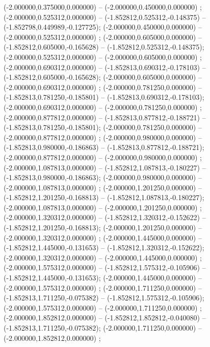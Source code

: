  (-2.000000,0.375000,0.000000) -- (-2.000000,0.450000,0.000000) ;
 (-2.000000,0.525312,0.000000) -- (-1.852812,0.525312,-0.148375) -- (-1.852798,0.449989,-0.127725);
 (-2.000000,0.450000,0.000000) -- (-2.000000,0.525312,0.000000) ;
 (-2.000000,0.605000,0.000000) -- (-1.852812,0.605000,-0.165628) -- (-1.852812,0.525312,-0.148375);
 (-2.000000,0.525312,0.000000) -- (-2.000000,0.605000,0.000000) ;
 (-2.000000,0.690312,0.000000) -- (-1.852813,0.690312,-0.178103) -- (-1.852812,0.605000,-0.165628);
 (-2.000000,0.605000,0.000000) -- (-2.000000,0.690312,0.000000) ;
 (-2.000000,0.781250,0.000000) -- (-1.852813,0.781250,-0.185801) -- (-1.852813,0.690312,-0.178103);
 (-2.000000,0.690312,0.000000) -- (-2.000000,0.781250,0.000000) ;
 (-2.000000,0.877812,0.000000) -- (-1.852813,0.877812,-0.188721) -- (-1.852813,0.781250,-0.185801);
 (-2.000000,0.781250,0.000000) -- (-2.000000,0.877812,0.000000) ;
 (-2.000000,0.980000,0.000000) -- (-1.852813,0.980000,-0.186863) -- (-1.852813,0.877812,-0.188721);
 (-2.000000,0.877812,0.000000) -- (-2.000000,0.980000,0.000000) ;
 (-2.000000,1.087813,0.000000) -- (-1.852812,1.087813,-0.180227) -- (-1.852813,0.980000,-0.186863);
 (-2.000000,0.980000,0.000000) -- (-2.000000,1.087813,0.000000) ;
 (-2.000000,1.201250,0.000000) -- (-1.852812,1.201250,-0.168813) -- (-1.852812,1.087813,-0.180227);
 (-2.000000,1.087813,0.000000) -- (-2.000000,1.201250,0.000000) ;
 (-2.000000,1.320312,0.000000) -- (-1.852812,1.320312,-0.152622) -- (-1.852812,1.201250,-0.168813);
 (-2.000000,1.201250,0.000000) -- (-2.000000,1.320312,0.000000) ;
 (-2.000000,1.445000,0.000000) -- (-1.852812,1.445000,-0.131653) -- (-1.852812,1.320312,-0.152622);
 (-2.000000,1.320312,0.000000) -- (-2.000000,1.445000,0.000000) ;
 (-2.000000,1.575312,0.000000) -- (-1.852812,1.575312,-0.105906) -- (-1.852812,1.445000,-0.131653);
 (-2.000000,1.445000,0.000000) -- (-2.000000,1.575312,0.000000) ;
 (-2.000000,1.711250,0.000000) -- (-1.852813,1.711250,-0.075382) -- (-1.852812,1.575312,-0.105906);
 (-2.000000,1.575312,0.000000) -- (-2.000000,1.711250,0.000000) ;
 (-2.000000,1.852812,0.000000) -- (-1.852812,1.852812,-0.040080) -- (-1.852813,1.711250,-0.075382);
 (-2.000000,1.711250,0.000000) -- (-2.000000,1.852812,0.000000) ;
